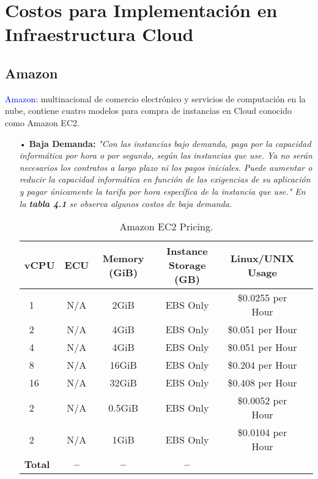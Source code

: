 \section{Costos para Implementación en Infraestructura Cloud} %
\label{sec:Costos para Implementación en Infraestructura Cloud}


\subsection{Amazon}

\textcolor{blue}{Amazon:} multinacional de comercio electrónico y servicios de computación en la nube, contiene cuatro modelos para compra de instancias en Cloud conocido como Amazon EC2.

\begin{itemize}
\item[•] \textbf{Baja Demanda:} \textit{"Con las instancias bajo demanda, paga por la capacidad informática por hora o por segundo, según las instancias que use. Ya no serán necesarios los contratos a largo plazo ni los pagos iniciales. Puede aumentar o reducir la capacidad informática en función de las exigencias de su aplicación y pagar únicamente la tarifa por hora específica de la instancia que use." En la \textbf{tabla 4.1} se observa algunos costos de baja demanda.}

\begin{table}[ht]
	\caption{Amazon EC2 Pricing.}
	\label{tab:hla:results}
\centering
\begin{tabular}{lccccc}
	\toprule
	\multicolumn{1}{c}{\textbf{vCPU}} 	& \textbf{ECU}	& \textbf{Memory (GiB)}	& \textbf{Instance Storage (GB)}
	& \textbf{Linux/UNIX Usage}\\
	\midrule
\cite{a1.medium}~1 		& N/A & 2GiB & EBS Only	& \$0.0255 per Hour \\
\cite{a1.large}~2 		& N/A & 4GiB & EBS Only & \$0.051 per Hour	\\
\cite{a1.xlarge}~4		& N/A & 4GiB & EBS Only & \$0.051 per Hour	\\
\cite{a1.2xlarge}~8 	& N/A & 16GiB & EBS Only & \$0.204 per Hour	\\
\cite{a1.4xlarge}~16	& N/A & 32GiB & EBS Only & \$0.408 per Hour	\\
\cite{t3.nano}~2		& N/A & 0.5GiB & EBS Only & \$0.0052 per Hour	\\
\cite{t3.micro}~2   	& N/A & 1GiB & EBS Only & \$0.0104 per Hour	\\
	\midrule
	\textbf{Total}			& \textbf{--}		& \textbf{--}		& \textbf{--} \\
	\bottomrule
\end{tabular}
\end{table}


\end{itemize}
